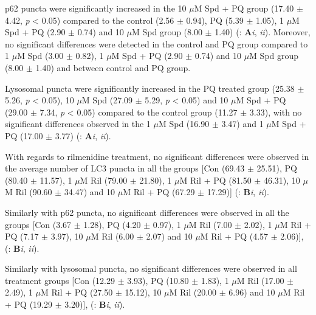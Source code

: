p62 puncta were significantly increased in the 10 $\mu$M Spd + PQ group (17.40 $\pm$ 4.42, \textit{p} < 0.05) compared to the control (2.56 $\pm$ 0.94), PQ (5.39 $\pm$ 1.05), 1 $\mu$M Spd + PQ (2.90 $\pm$ 0.74) and 10 $\mu$M Spd group (8.00 $\pm$ 1.40) (: \textbf{A}\textit{i}, \textit{ii}). Moreover, no significant differences were detected in the control and PQ group compared to 1 $\mu$M Spd (3.00 $\pm$ 0.82), 1 $\mu$M Spd + PQ (2.90 $\pm$ 0.74) and 10 $\mu$M Spd group (8.00 $\pm$ 1.40) and between control and PQ group.

Lysosomal puncta were significantly increased in the PQ treated group (25.38 $\pm$ 5.26, \textit{p} < 0.05), 10 $\mu$M Spd (27.09 $\pm$ 5.29, \textit{p} < 0.05) and 10 $\mu$M Spd + PQ (29.00 $\pm$ 7.34, \textit{p} < 0.05) compared to the control group (11.27 $\pm$ 3.33), with no significant differences observed in the 1 $\mu$M Spd (16.90 $\pm$ 3.47) and 1 $\mu$M Spd + PQ (17.00 $\pm$ 3.77) (: \textbf{A}\textit{i}, \textit{ii}).

With regards to rilmenidine treatment, no significant differences were observed in the average number of LC3 puncta in all the groups [Con (69.43 $\pm$ 25.51), PQ (80.40 $\pm$ 11.57), 1 $\mu$M Ril (79.00 $\pm$ 21.80), 1 $\mu$M Ril + PQ (81.50 $\pm$ 46.31), 10 $\mu$M Ril (90.60 $\pm$ 34.47) and 10 $\mu$M Ril + PQ (67.29 $\pm$ 17.29)] (: \textbf{B}\textit{i}, \textit{ii}).

Similarly with p62 puncta, no significant differences were observed in all the groups [Con (3.67 $\pm$ 1.28), PQ (4.20 $\pm$ 0.97), 1 $\mu$M Ril (7.00 $\pm$ 2.02), 1 $\mu$M Ril + PQ (7.17 $\pm$ 3.97), 10 $\mu$M Ril (6.00 $\pm$ 2.07) and 10 $\mu$M Ril + PQ (4.57 $\pm$ 2.06)], (: \textbf{B}\textit{i}, \textit{ii}).

Similarly with lysosomal puncta, no significant differences were observed in all treatment groups [Con (12.29 $\pm$ 3.93), PQ (10.80 $\pm$ 1.83), 1 $\mu$M Ril (17.00 $\pm$ 2.49), 1 $\mu$M Ril + PQ (27.50 $\pm$ 15.12), 10 $\mu$M Ril (20.00 $\pm$ 6.96) and 10 $\mu$M Ril + PQ (19.29 $\pm$ 3.20)], (: \textbf{B}\textit{i}, \textit{ii}).

